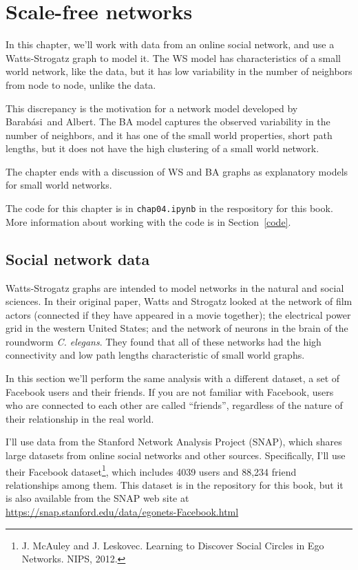 \documentclass[12pt]{book}
\theoremstyle{exercise}
\begin{document}
\chapter{Scale-free networks}
\label{scale-free}

\newcommand{\Barabasi}{Barab\'{a}si}

In this chapter, we'll work with data from an online social network, and use a
Watts-Strogatz graph to model it.  The WS model has characteristics of
a small world network, like the data, but it has low
variability in the number of neighbors from node to node,
unlike the data.

This discrepancy is the motivation for a network model developed
by \Barabasi~and Albert.  The BA model captures the observed variability
in the number of neighbors, and it has one of the small world
properties, short path lengths, but it does not have the high
clustering of a small world network.

The chapter ends with a discussion of WS and BA graphs as explanatory
models for small world networks.

The code for this chapter is in {\tt chap04.ipynb} in the respository
for this book.  More information about working with the code is
in Section~\ref{code}.


\section{Social network data}

Watts-Strogatz graphs are intended to model networks in the natural
and social sciences.  In their original paper, Watts and Strogatz
looked at the network of film actors (connected if they have appeared
in a movie together); the electrical power grid in the western United
States; and the network of neurons in the brain of the roundworm
{\it C. elegans}.  They found that all of these networks had the
high connectivity and low path lengths characteristic of small world
graphs.

In this section we'll perform the same analysis with a different
dataset, a set of Facebook users and their friends.  If you are not
familiar with Facebook, users who are connected to each other are
called ``friends'', regardless of the nature of their relationship in
the real world.

I'll use data from the Stanford Network Analysis Project (SNAP), which
shares large datasets from online social networks and other sources.
Specifically, I'll use their Facebook dataset\footnote{J. McAuley and
  J. Leskovec. Learning to Discover Social Circles in Ego
  Networks. NIPS, 2012.}, which includes 4039 users and 88,234
friend relationships among them.  This dataset is in the repository
for this book, but it is also available from the SNAP web site at
\url{https://snap.stanford.edu/data/egonets-Facebook.html}
\end{document}
